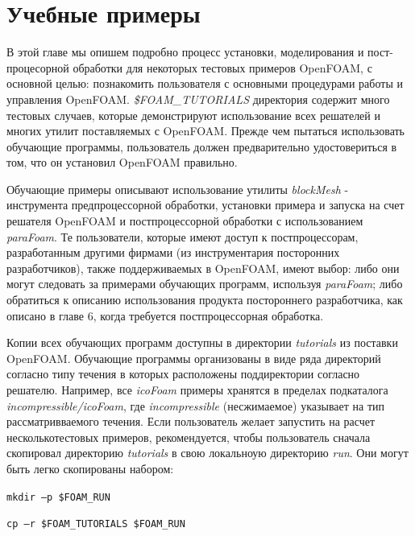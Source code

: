 \chapter{Учебные примеры}
В этой главе мы опишем подробно процесс установки, моделирования и пост- процесорной обработки для некоторых тестовых
 примеров OpenFOAM, с основной целью: познакомить пользователя с основными процедурами работы и управления OpenFOAM.
 \textit{\$FOAM\_TUTORIALS} директория содержит много тестовых случаев, которые демонстрируют использование всех
 решателей и многих утилит поставляемых с OpenFOAM. Прежде чем пытаться использовать обучающие программы, пользователь
 должен предварительно удостовериться  в том, что он установил OpenFOAM правильно.

Обучающие примеры описывают использование утилиты \textsl{blockMesh} - инструмента предпроцессорной обработки, установки 
примера и запуска на счет решателя OpenFOAM и постпроцессорной обработки с использованием \textsl{paraFoam}.
 Те пользователи, которые имеют доступ к постпроцессорам, разработанным другими фирмами (из инструментария посторонних
 разработчиков), также поддерживаемых в OpenFOAM, имеют выбор: либо они могут следовать за примерами обучающих программ,
 используя \textsl{paraFoam}; либо обратиться к описанию использования продукта постороннего разработчика, как описано в
главе 6, когда требуется постпроцессорная обработка.

Копии всех обучающих программ доступны в директории \textit{tutorials} из поставки OpenFOAM.
Обучающие программы организованы
 в виде ряда директорий согласно типу течения в которых расположены поддиректории согласно решателю. Например,
 все \textsl{icoFoam} примеры хранятся в пределах подкаталога \textit{incompressible/icoFoam}, где \textit{incompressible}
(несжимаемое)  указывает на тип рассматривваемого течения. Если пользователь желает запустить на расчет несколькотестовых 
примеров,  рекомендуется, чтобы пользователь сначала скопировал директорию \textit{tutorials} в свою локальноую директорию
\textit{run}. Они могут быть легко скопированы набором:

\texttt{mkdir –p \$FOAM\_RUN}

\texttt{cp –r \$FOAM\_TUTORIALS \$FOAM\_RUN}

